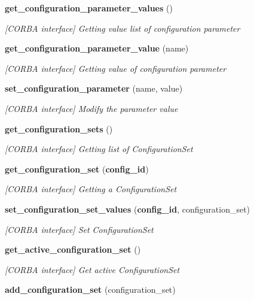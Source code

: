 \begin{CompactItemize}
{\bf get\_\-configuration\_\-parameter\_\-values} ()
\begin{CompactList}\small\item\em [CORBA interface] Getting value list of configuration parameter \item\end{CompactList}\item 
{\bf get\_\-configuration\_\-parameter\_\-value} (name)
\begin{CompactList}\small\item\em [CORBA interface] Getting value of configuration parameter \item\end{CompactList}\item 
{\bf set\_\-configuration\_\-parameter} (name, value)
\begin{CompactList}\small\item\em [CORBA interface] Modify the parameter value \item\end{CompactList}\item 
{\bf get\_\-configuration\_\-sets} ()
\begin{CompactList}\small\item\em [CORBA interface] Getting list of Configuration\-Set \item\end{CompactList}\item 
{\bf get\_\-configuration\_\-set} ({\bf config\_\-id})
\begin{CompactList}\small\item\em [CORBA interface] Getting a Configuration\-Set \item\end{CompactList}\item 
{\bf set\_\-configuration\_\-set\_\-values} ({\bf config\_\-id}, configuration\_\-set)
\begin{CompactList}\small\item\em [CORBA interface] Set Configuration\-Set \item\end{CompactList}\item 
{\bf get\_\-active\_\-configuration\_\-set} ()
\begin{CompactList}\small\item\em [CORBA interface] Get active Configuration\-Set \item\end{CompactList}\item 
{\bf add\_\-configuration\_\-set} (configuration\_\-set)

\end{CompactItemize}

